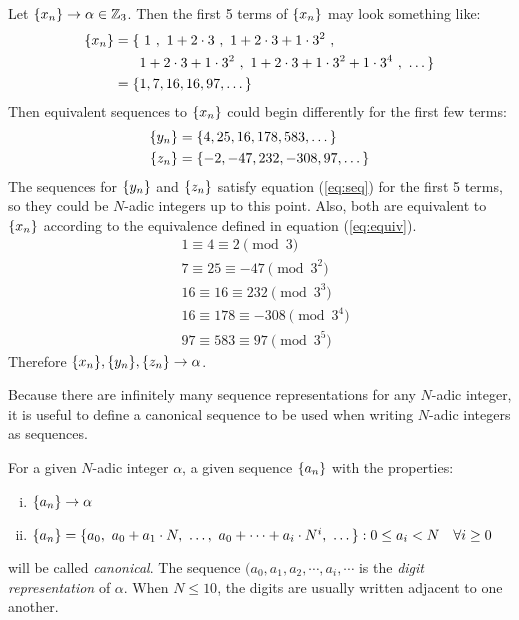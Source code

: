 \begin{example} \label{ex:equiv-seq}
  Let $\{x_n\} \rightarrow \alpha \in \mathbb{Z}_3$. Then the first 5 terms of
  $\{x_n\}$ may look something like:
  \begin{align*}
    \{x_n\} = \{&\ 1\ , \ 1+2\cdot3 \ , \ 1+2\cdot3+1\cdot3^2 \ ,\\
            &1+2\cdot3+1\cdot3^2 \ , \ 1+2\cdot3+1\cdot3^2+1\cdot3^4 \ ,
              \ \dots\}\\
        = \{&1,7,16,16,97,\dots\}
  \end{align*}
  Then equivalent sequences to $\{x_n\}$ could begin differently for the first
  few terms:
  \begin{align*}
    \{y_n\} &= \{4,25,16,178,583,\dots\} \\
    \{z_n\} &= \{-2,-47,232,-308,97,\dots\}
  \end{align*}
  The sequences for $\{y_n\}$ and $\{z_n\}$ satisfy equation (\ref{eq:seq}) for the
  first 5 terms, so they could be $N$-adic integers up to this point. Also,
  both are equivalent to $\{x_n\}$ according to the equivalence defined in
  equation (\ref{eq:equiv}).
  \begin{align*}
    &1 \equiv 4 \equiv 2 \pmod 3 \\
    &7 \equiv 25 \equiv -47 \pmod{3^2} \\
    &16 \equiv 16 \equiv 232 \pmod{3^3} \\
    &16 \equiv 178 \equiv -308 \pmod{3^4} \\
    &97 \equiv 583 \equiv 97 \pmod{3^5}
  \end{align*}
  Therefore $\{x_n\},\{y_n\},\{z_n\} \rightarrow \alpha$.
\end{example}

\par Because there are infinitely many sequence representations for any
$N$-adic integer, it is useful to define a canonical sequence to be used
when writing $N$-adic integers as sequences.
  
\begin{definition}
\label{def:canon}
  For a given $N$-adic integer $\alpha$, a given sequence $\{a_n\}$ with
  the properties:
  \begin{enumerate}[i.]
    \item $\{a_n\} \rightarrow \alpha$
    \item $\{a_n\}=\{a_0, \ a_0+a_1\cdot N, \ \dots, \ a_0+\dots+a_i\cdot N^i, \ \dots\} : 0 \leq a_i < N \ \ \ \forall i \geq 0$
  \end{enumerate}
  will be called {\em canonical}. The sequence
  $(a_0,a_1,a_2,\cdots,a_i,\cdots$ is the {\em digit representation} of
  $\alpha$. When $N\leq10$, the digits are usually written adjacent to one
  another.
\end{definition}

